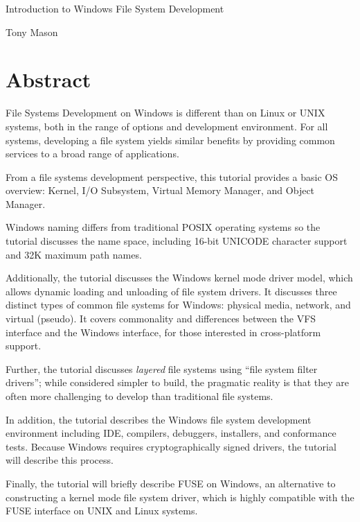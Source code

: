 \documentclass[letter,11pt]{article}
\begin{document}
\begin{center}
    {\MakeUppercase\Huge Introduction to Windows File System Development}

    \vspace{0.5cm}
    
    {\MakeUppercase\Large Tony Mason}

\end{center}

\section*{Abstract}

File Systems Development on Windows is different than on Linux or UNIX systems, both in the range of options and development environment.  For all systems, developing a file system yields similar benefits by providing common services to a broad range of applications.

From a file systems development perspective, this tutorial provides a basic OS overview: Kernel, I/O Subsystem, Virtual Memory Manager, and Object Manager.  

Windows naming differs from traditional POSIX operating systems so the tutorial discusses the name space, including 16-bit UNICODE character support and 32K maximum path names.

Additionally, the tutorial discusses the Windows kernel mode driver model, which allows dynamic loading and unloading of file system drivers.  It discusses three distinct types of common file systems for Windows: physical media, network, and virtual (pseudo).  It covers commonality and differences between the VFS interface and the Windows interface, for those interested in cross-platform support.

Further, the tutorial discusses \textit{layered} file systems using ``file system filter drivers''; while considered simpler to build, the pragmatic reality is that they are often more challenging to develop than traditional file systems.

In addition, the tutorial describes the Windows file system development environment including IDE, compilers, debuggers, installers, and conformance tests. Because Windows requires cryptographically signed drivers, the tutorial will describe this process. 

Finally, the tutorial will briefly describe FUSE on Windows, an alternative to constructing a kernel mode file system driver, which is highly compatible with the FUSE interface on UNIX and Linux systems.
\end{document}
